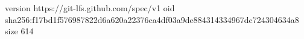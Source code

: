 version https://git-lfs.github.com/spec/v1
oid sha256:f17bd1f576987822d6a620a22376ca4df03a9de884314334967dc724304634a8
size 614
